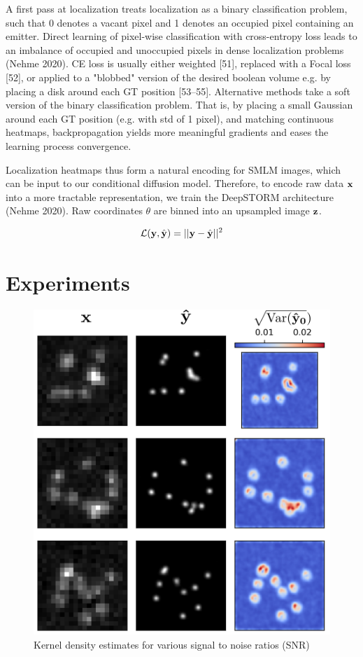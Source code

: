 \documentclass{article}
\begin{document}
A first pass at localization treats localization as a binary classification problem, such that 0 denotes a vacant pixel and 1 denotes an occupied pixel containing an emitter. Direct learning of pixel-wise classification with cross-entropy loss leads to an imbalance of occupied and unoccupied pixels in dense localization problems (Nehme 2020). CE loss is usually either weighted [51], replaced with a Focal loss [52], or applied to a "blobbed" version of the desired boolean volume e.g. by placing a disk around each GT position [53–55]. Alternative methods take a soft version of the binary classification problem. That is, by placing a small Gaussian around each GT position (e.g. with std of 1 pixel), and matching continuous heatmaps, backpropagation yields more meaningful gradients and eases the learning process convergence. 

Localization heatmaps thus form a natural encoding for SMLM images, which can be input to our conditional diffusion model. Therefore, to encode raw data $\bold{x}$ into a more tractable representation, we train the DeepSTORM architecture (Nehme 2020). Raw coordinates $\theta$ are binned into an upsampled image $\bold{z}$. 

\begin{equation*}
\mathcal{L}(\bold{y},\hat{\bold{y}}) = \lvert\lvert\bold{y}- \hat{\bold{y}}\lvert\lvert^2
\end{equation*} 


\section{Experiments}

\begin{figure}
\centering
\includegraphics[scale=0.8]{Samples.png}
\caption{Kernel density estimates for various signal to noise ratios (SNR)}
\end{figure}
\end{document}
